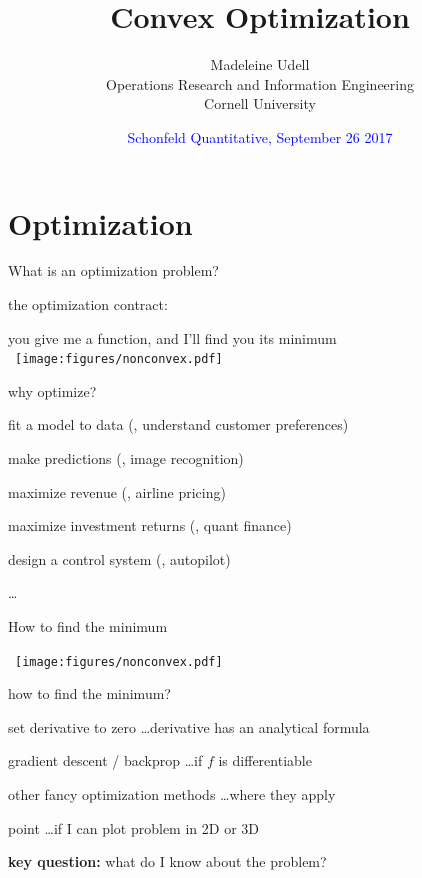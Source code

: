 \documentclass[presentation]{beamer}
\title{Convex Optimization}
\date[Schonfeld Quantitative, September 26 2017]{\textcolor{blue}{Schonfeld Quantitative, September 26 2017}}
\author[M.~Udell, Cornell. \textit{Optimization in Julia.}]{%
Madeleine Udell \\[1ex]
Operations Research and Information Engineering\\
Cornell University\\
}
\newcommand{\figures}{./figures}
\begin{document}
\begin{frame}
\titlepage
\end{frame}


\section{Optimization}

\begin{frame}{What is an optimization problem?}

the optimization contract:
\bit
\item you give me a function, and I'll find you its minimum
\hbox{\hspace{.2in} \texttt{[image: \\figures/nonconvex.pdf]}}
\vspace{-.45in}
\pause\item why optimize?

\bit
\item fit a model to data (\eg, understand customer preferences)
\item make predictions (\eg, image recognition)
\item maximize revenue (\eg, airline pricing)
\item maximize investment returns (\eg, quant finance)
\item design a control system (\eg, autopilot)
\item \ldots
\eit

\eit
\end{frame}

\begin{frame}{How to find the minimum}

\hbox{\hspace{.4in} \texttt{[image: \\figures/nonconvex.pdf]}}

\vspace{-.2in}
how to find the minimum? \pause
\bit
\pause \item set derivative to zero \pause \ldots derivative has an analytical formula
\pause \item gradient descent / backprop \pause \ldots if $f$ is differentiable
\pause \item other fancy optimization methods \pause \ldots where they apply
\pause \item point \pause \ldots if I can plot problem in 2D or 3D
\eit

\pause \textbf{key question:} what do I know about the problem?

\end{frame}
\end{document}
